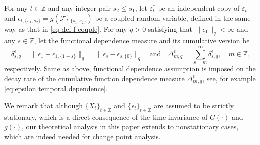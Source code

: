 \documentclass[11pt]{article}
\theoremstyle{plain}
\theoremstyle{definition}
\begin{document}
For any $t \in \mathbb{Z}$ and any integer pair $s_2 \leq s_1$, let $\varepsilon_t^*$ be an independent copy of $\varepsilon_t$ and $\epsilon_{t, \{s_1, s_2\}} = g(\mathcal{F}^\epsilon _{t, \{s_1, s_2\}})$ be a coupled random variable, defined in the same way as that in \eqref{eq-def-f-couple}.  For any $q > 0$ satisfying that $\|  \epsilon_1\|_q < \infty$ and any $s \in \mathbb{Z}$, let the functional dependence measure and its cumulative version be
\begin{equation}\label{eq-functional-dependence-eps-def}
    \delta_{s, q}^\epsilon = \|\epsilon_1 - \epsilon_{1, \{1-s\}}\|_q = \|\epsilon_s - \epsilon _{s, \{0\}}\|_q \quad \text{and} \quad \Delta_{m, q}^\epsilon = \sum_{s = m}^{\infty}\delta ^\epsilon_{s, q}, \quad m \in \mathbb{Z},
\end{equation}
respectively. Same as above, functional dependence assumption is imposed on the decay rate of the cumulative function dependence measure $\Delta_{m, q}^\epsilon$, see, for example \eqref{eq:epsilon temporal dependence}.

We remark that although $\{X_t\}_{t \in \mathbb{Z}}$ and $\{\epsilon_t\}_{t \in \mathbb{Z}}$ are assumed to be strictly stationary, which is a direct consequence of the time-invariance of $G(\cdot)$ and $g(\cdot)$, our theoretical analysis in this paper extends to nonstationary cases, which are indeed needed for change point analysis.
\end{document}
